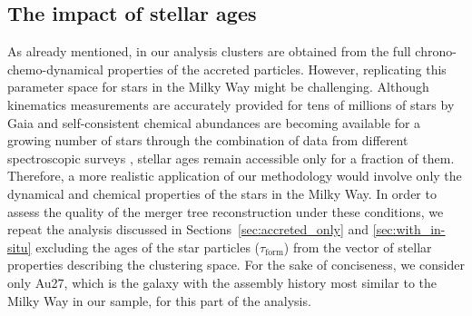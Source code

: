 \subsection{The impact of stellar ages}
\label{sec:no_ages}

As already mentioned, in our analysis clusters are obtained from the full chrono-chemo-dynamical properties of the accreted particles. However, replicating this parameter space for stars in the Milky Way might be challenging. Although kinematics measurements are accurately provided for tens of millions of stars by Gaia and self-consistent chemical abundances are becoming available for a growing number of stars through the combination of data from different spectroscopic surveys \citep{Thomas2024,Horta2025}, stellar ages remain accessible only for a fraction of them. Therefore, a more realistic application of our methodology would involve only the dynamical and chemical properties of the stars in the Milky Way. In order to assess the quality of the merger tree reconstruction under these conditions, we repeat the analysis discussed in Sections~\ref{sec:accreted_only} and \ref{sec:with_in-situ} excluding the ages of the star particles ($\tau_{\text{form}}$) from the vector of stellar properties describing the clustering space. For the sake of conciseness, we consider only Au27, which is the galaxy with the assembly history most similar to the Milky Way in our sample, for this part of the analysis. 

